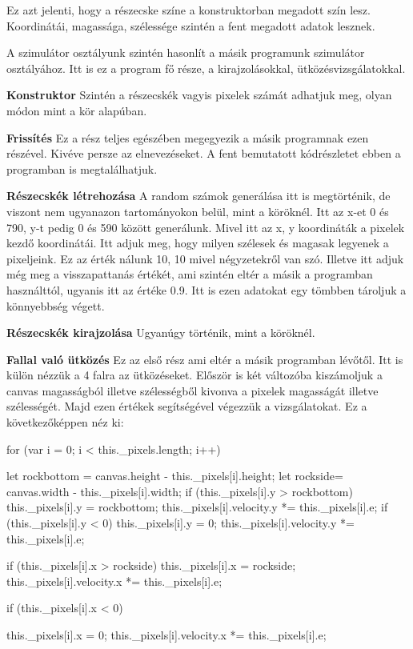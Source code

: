 Ez azt jelenti, hogy a részecske színe a konstruktorban megadott szín lesz. Koordinátái, magassága, szélessége szintén a fent megadott adatok lesznek.



A szimulátor osztályunk szintén hasonlít a másik programunk szimulátor osztályához. Itt is ez a program fő része, a kirajzolásokkal, ütközésvizsgálatokkal. 

\textbf{Konstruktor}
Szintén a részecskék vagyis pixelek számát adhatjuk meg, olyan módon mint a kör alapúban.

\textbf{Frissítés}
Ez a rész teljes egészében megegyezik a másik programnak ezen részével. Kivéve persze az elnevezéseket. A fent bemutatott kódrészletet ebben a programban is megtalálhatjuk.

\textbf{Részecskék létrehozása}
A random számok generálása itt is megtörténik, de viszont nem ugyanazon tartományokon belül, mint a köröknél. Itt az x-et 0 és 790, y-t pedig 0 és 590 között generálunk. Mivel itt az x, y koordináták a pixelek kezdő koordinátái. Itt adjuk meg, hogy milyen szélesek és magasak legyenek a pixeljeink. Ez az érték nálunk 10, 10 mivel négyzetekről van szó. Illetve itt adjuk még meg a visszapattanás értékét, ami szintén eltér a másik a programban használttól, ugyanis itt az értéke 0.9. Itt is ezen adatokat egy tömbben tároljuk a könnyebbség végett. 

\textbf{Részecskék kirajzolása}
Ugyanúgy történik, mint a köröknél. 

\textbf{Fallal való ütközés}
Ez az első rész ami eltér a másik programban lévőtől. Itt is külön nézzük a 4 falra az ütközéseket. Először is két változóba kiszámoljuk a canvas magasságból illetve szélességből kivonva a pixelek magasságát illetve szélességét. Majd ezen értékek segítségével végezzük a vizsgálatokat. Ez a következőképpen néz ki:
\begin{java}
	for (var i = 0; i < this._pixels.length; i++) {
		let rockbottom = canvas.height 
		- this._pixels[i].height;
		let rockside= canvas.width
		- this._pixels[i].width;
		if (this._pixels[i].y > rockbottom) {
			this._pixels[i].y = rockbottom;
			this._pixels[i].velocity.y 
			*= this._pixels[i].e;
		}
		if (this._pixels[i].y < 0){
			this._pixels[i].y = 0;
			this._pixels[i].velocity.y 
			*= this._pixels[i].e;
		}
		
		if (this._pixels[i].x > rockside) {
			this._pixels[i].x = rockside;
			this._pixels[i].velocity.x 
			*= this._pixels[i].e;
		}
		
		if (this._pixels[i].x < 0){
			this._pixels[i].x = 0;
			this._pixels[i].velocity.x 
			*= this._pixels[i].e;
			
		}
		
	}
\end{java}
 

